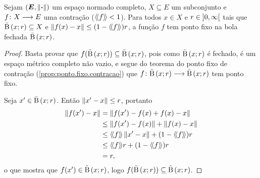 \begin{proposition}
\label{prop:lema.contracao}
Sejam $(\bm E,\left\Vert{\bm{\cdot}}\right\Vert)$ um espaço normado completo, $X \subseteq E$ um subconjunto e $f\colon \allowbreak X \longrightarrow E$ uma contração ($\langle\!\langle{f}\rangle\!\rangle<1$). Para todos $x \in X$ e $r \in \left]0,\allowbreak \infty\right[$ tais que $\bar{\mathrm{B}}\left(x; r\right) \subseteq X$ e $\left\Vert{f(x)-x}\right\Vert \leq (1-\langle\!\langle{f}\rangle\!\rangle)r$, a função $f$ tem ponto fixo na bola fechada $\bar{\mathrm{B}}\left(x; r\right)$.
\end{proposition}
\begin{proof}
Basta provar que $f(\bar{\mathrm{B}}\left(x; r\right)) \subseteq \bar{\mathrm{B}}\left(x; r\right)$, pois como $\bar{\mathrm{B}}\left(x; r\right)$ é fechado, é um espaço métrico completo não vazio, e segue do teorema do ponto fixo de contração (\ref{prop:ponto.fixo.contracao}) que $f\colon \allowbreak \bar{\mathrm{B}}\left(x; r\right) \longrightarrow \bar{\mathrm{B}}\left(x; r\right)$ tem ponto fixo.

Seja $x' \in \bar{\mathrm{B}}\left(x; r\right)$. Então $\left\Vert{x'-x}\right\Vert \leq r$, portanto
	\begin{align*}
	\nor{f(x')-x} &= \nor{f(x') - f(x) + f(x) - x} \\
		&\leq \nor{f(x') - f(x)} + \nor{f(x) - x} \\
		&\leq \distor{f}\nor{x'-x} + (1-\distor{f})r \\
		&\leq \distor{f}r + (1-\distor{f})r \\
		&= r,
	\end{align*}
o que mostra que $f(x') \in \bar{\mathrm{B}}\left(x; r\right)$, logo $f(\bar{\mathrm{B}}\left(x; r\right)) \subseteq \bar{\mathrm{B}}\left(x; r\right)$.
\end{proof}

